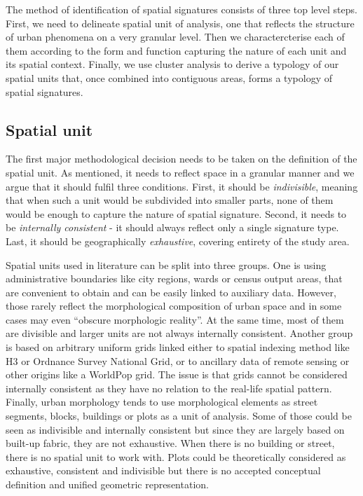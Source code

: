 The method of identification of spatial signatures consists of three top level steps.
First, we need to delineate spatial unit of analysis, one that reflects the structure of
urban phenomena on a very granular level. Then we charactercterise each of them
according to the form and function capturing the nature of each unit and its spatial
context. Finally, we use cluster analysis to derive a typology of our spatial units
that, once combined into contiguous areas, forms a typology of spatial signatures.

\subsection*{Spatial unit}
The first major methodological decision needs to be taken on the definition of the
spatial unit. As mentioned, it needs to reflect space in a granular manner and we argue
that it should fulfil three conditions. First, it should be \textit{indivisible},
meaning that when such a unit would be subdivided into smaller parts, none of them would
be enough to capture the nature of spatial signature. Second, it needs to be
\textit{internally consistent} - it should always reflect only a single signature type.
Last, it should be geographically \textit{exhaustive}, covering entirety of the study
area.

Spatial units used in literature can be split into three groups. One is using
administrative boundaries like city regions\cite{angel2020}, wards or census output areas\cite{alexiou2016}, that are
convenient to obtain and can be easily linked to auxiliary data. However,
those rarely reflect the morphological composition of urban space and in some cases may
even “obscure morphologic reality”\cite{taubenbock2019new}. At the same time, most of them
are divisible and larger units are not always internally consistent. Another group is based on
arbitrary uniform grids linked either to spatial indexing method like
H3\cite{brodsky2018h3} or Ordnance Survey
National Grid, or to ancillary data of remote sensing or other origins like a
WorldPop grid\cite{jochem2021tools}. The issue is that grids cannot be considered internally consistent as
they have no relation to the real-life spatial pattern. Finally, urban morphology tends to use morphological elements as
street segments\cite{araldi2019}, blocks\cite{gil2012}, buildings\cite{hamaina2012a} or plots\cite{bobkova2019} as a unit of analysis. Some of those
could be seen as indivisible and internally consistent but since they are largely based
on built-up fabric, they are not exhaustive. When there is no building or street, there
is no spatial unit to work with. Plots could be theoretically considered as exhaustive,
consistent and indivisible but there is no accepted conceptual definition and unified
geometric representation\cite{kropf2018}.

